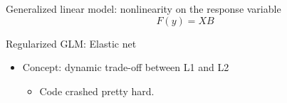 \documentclass[svgnames,13pt]{beamer}
\begin{document}
\appendix{}
\setcounter{finalframe}{\value{framenumber}}
\setcounter{framenumber}{\value{finalframe}}

\begin{frame}{Generalized linear model: nonlinearity on the response variable}
\[F(y) = XB\]
\end{frame} 

\begin{frame}{Regularized GLM: Elastic net}
\begin{itemize}
	\item <1->Concept: dynamic trade-off between L1 and L2
	\begin{itemize}
		\item <2-> Code crashed pretty hard. 
	\end{itemize}
\end{itemize}
\end{frame} 
\end{document}
